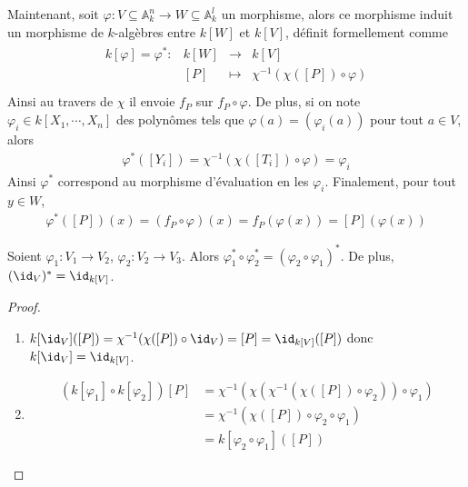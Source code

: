         Maintenant, soit $\varphi : V \subseteq \mathbb{A}_k^n \to W \subseteq \mathbb{A}_k^l$ un morphisme, alors ce morphisme induit un morphisme de $k$-algèbres entre $k[W]$ et $k[V]$, définit formellement comme
        \begin{align*}
            \begin{array}{cccc}
                k[\varphi] = \varphi^* : & k[W] & \to & k[V] \\
                & [P] & \mapsto & \chi^{-1}(\chi([P]) \circ \varphi) \\
            \end{array}
        \end{align*}
        Ainsi au travers de $\chi$ il envoie $f_P$ sur $f_P \circ \varphi$. De plus, si on note $\varphi_i \in k[X_1, \cdots, X_n]$ des polynômes tels que $\varphi(a) = (\varphi_i(a))$ pour tout $a \in V$, alors 
        \begin{align*}
            \varphi^*([Y_i]) = \chi^{-1}(\chi([T_i]) \circ \varphi) = \varphi_i
        \end{align*}
        Ainsi $\varphi^*$ correspond au morphisme d'évaluation en les $\varphi_i$. Finalement, pour tout $y \in W$,
        \begin{align*}
            \varphi^*([P])(x) = (f_P \circ \varphi)(x) = f_P(\varphi(x)) = [P](\varphi(x))
        \end{align*}
        \begin{prop}
            \label{phistarfunct}
            Soient $\varphi_1 : V_1 \to V_2$, $\varphi_2 : V_2 \to V_3$. Alors $\varphi_1^* \circ \varphi_2^* = (\varphi_2 \circ \varphi_1)^*$. De plus, $(\id_V)^* = \id_{k[V]}$.
        \end{prop}
        \begin{proof}
            \begin{enumerate}
                \item $k[\id_V]([P]) = \chi^{-1}(\chi([P]) \circ \id_V) = [P] = \id_{k[V]}([P])$ donc $k[\id_V] = \id_{k[V]}$.
                \item
                \begin{align*}
                    (k[\varphi_1] \circ k[\varphi_2])[P] &= \chi^{-1}(\chi( \chi^{-1}(\chi([P]) \circ \varphi_2) ) \circ \varphi_1) \\
                    &= \chi^{-1}(\chi([P]) \circ \varphi_2 \circ \varphi_1) \\
                    &= k[\varphi_2 \circ \varphi_1]([P])
                \end{align*}
            \end{enumerate}
        \end{proof}
